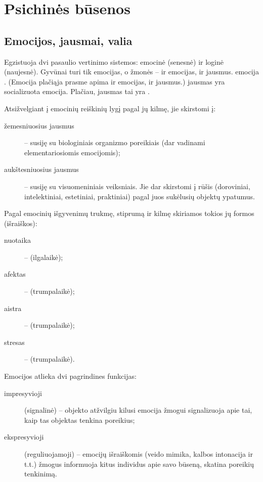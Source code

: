 \chapter{Psichinės būsenos}

\label{tema:psichines_busenos}

\section{Emocijos, jausmai, valia}

Egzistuoja dvi pasaulio vertinimo sistemos: emocinė (senesnė) ir loginė 
(naujesnė). Gyvūnai turi tik emocijas, o žmonės – ir emocijas, ir jausmus. 
\Gls{emocija} . (Emocija plačiąja prasme apima
ir emocijas, ir jausmus.) \Gls{jausmas} yra socializuota 
\gls{emocija}. Plačiau, \gls{jausmas} tai yra .

\label{tema:emocijos}
Atsižvelgiant į emocinių reiškinių lygį pagal jų kilmę, jie skirstomi į:
\begin{description}
  \item[žemesniuosius jausmus] – susiję su biologiniais organizmo 
    poreikiais (dar vadinami elementariosiomis emocijomis);
  \item[aukštesniuosius jausmus] – susiję su visuomeniniais veiksniais.
    Jie dar skirstomi į rūšis (doroviniai, intelektiniai, estetiniai,
    praktiniai) pagal juos sukėlusių objektų ypatumus.
\end{description}

Pagal emocinių išgyvenimų trukmę, stiprumą ir kilmę skiriamos tokios
jų formos (išraiškos):
\begin{description}
  \item[\gls{nuotaika}] –  (ilgalaikė);
  \item[\gls{afektas}] –  (trumpalaikė);
  \item[\gls{aistra}] –  (trumpalaikė);
  \item[\gls{stresas}] –  (trumpalaikė).
\end{description}

Emocijos atlieka dvi pagrindines funkcijas:
\begin{description}
  \item[impresyvioji] (signalinė) – objekto atžvilgiu kilusi emocija
    žmogui signalizuoja apie tai, kaip tas objektas tenkina poreikius;
  \item[ekspresyvioji] (reguliuojamoji) – emocijų išraiškomis (veido
    mimika, kalbos intonacija ir t.t.) žmogus informuoja kitus individus 
    apie savo būseną, skatina poreikių tenkinimą.
\end{description}

